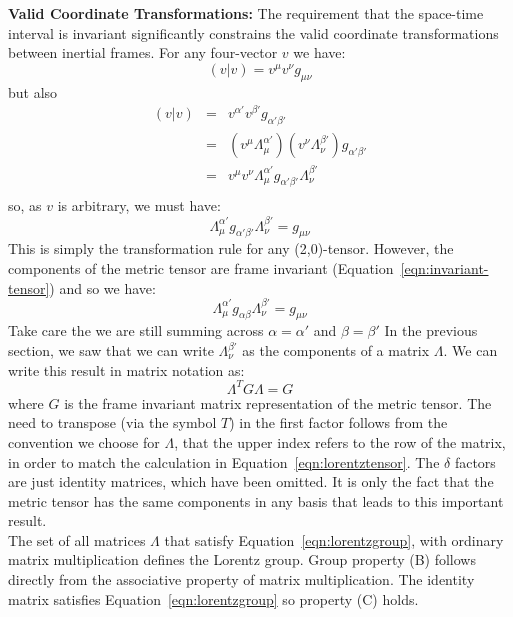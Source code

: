 \documentclass[12pt]{article}
\begin{document}
\noindent
{\bf Valid Coordinate Transformations:} The requirement that the
space-time interval is invariant significantly constrains the valid
coordinate transformations between inertial frames.  For any
four-vector $v$ we have:
$$(v|v) = v^{\mu} v^{\nu} g_{\mu\nu}$$
but also
\begin{eqnarray*}
  (v|v) &=& v^{\alpha'} v^{\beta'} g_{\alpha'\beta'}\\
  &=& (v^{\mu}\Lambda^{\alpha'}_{\mu}) (v^{\nu}\Lambda^{\beta'}_\nu) g_{\alpha'\beta'}\\
    &=& v^{\mu} v^{\nu} \Lambda^{\alpha'}_{\mu} g_{\alpha'\beta'} \Lambda^{\beta'}_\nu \\
\end{eqnarray*}
so, as $v$ is arbitrary, we must have:
\begin{equation}
\label{eqn:lorentzgrouptn}
\Lambda^{\alpha'}_{\mu} g_{\alpha'\beta'} \Lambda^{\beta'}_\nu =g_{\mu\nu}
\end{equation}
This is simply the transformation rule for any (2,0)-tensor.  However, the components of the metric tensor are frame invariant (Equation~\ref{eqn:invariant-tensor}) and so we have:
\begin{equation}
 \label{eqn:lorentztensor}
\Lambda^{\alpha'}_{\mu} g_{\alpha\beta} \Lambda^{\beta'}_\nu =g_{\mu\nu}
\end{equation}
Take care the we are still summing across $\alpha=\alpha'$ and $\beta=\beta'$
In the previous section, we saw that we can write
$\Lambda^{\beta'}_\nu$ as the components of a matrix $\Lambda$.
We can write this result in matrix notation as:
\begin{equation}
 \label{eqn:lorentzgroup}
 \Lambda^T G \Lambda = G
\end{equation}
where $G$ is the frame invariant matrix representation of the metric
tensor.  The need to transpose (via the symbol $T$) in the first
factor follows from the convention we choose for $\Lambda$, that the
upper index refers to the row of the matrix, in order to match the
calculation in Equation~\ref{eqn:lorentztensor}.  The $\delta$ factors
are just identity matrices, which have been omitted.  It is only the
fact that the metric tensor has the same components in any basis that
leads to this important result.\\[3pt]


\noindent
The set of all matrices $\Lambda$ that satisfy
Equation~\ref{eqn:lorentzgroup}, with ordinary matrix
multiplication defines the Lorentz group.  Group property (B) follows
directly from the associative property of matrix multiplication.  The
identity matrix satisfies Equation~\ref{eqn:lorentzgroup} so property
(C) holds.\\[5pt]
\end{document}
